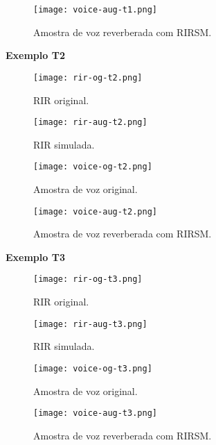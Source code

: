 \begin{figure} [H]
    \centering
    \texttt{[image: voice-aug-t1.png]}
    \caption{Amostra de voz reverberada com RIRSM.}
    \label{fig-a:voice-aug-t1}
\end{figure}

\pagebreak
{\Large \textbf{Exemplo T2}}

\begin{figure} [H]
    \centering
    \texttt{[image: rir-og-t2.png]}
    \caption{RIR original.}
    \label{fig-a:rir-og-t2}
\end{figure} 

\begin{figure} [H]
    \centering
    \texttt{[image: rir-aug-t2.png]}
    \caption{RIR simulada.}
    \label{fig-a:rir-aug-t2}
\end{figure} 

\begin{figure} [H]
    \centering
    \texttt{[image: voice-og-t2.png]}
    \caption{Amostra de voz original.}
    \label{fig-a:voice-og-t2}
\end{figure} 

\begin{figure} [H]
    \centering
    \texttt{[image: voice-aug-t2.png]}
    \caption{Amostra de voz reverberada com RIRSM.}
    \label{fig-a:voice-aug-t2}
\end{figure}

\pagebreak
{\Large \textbf{Exemplo T3}}

\begin{figure} [H]
    \centering
    \texttt{[image: rir-og-t3.png]}
    \caption{RIR original.}
    \label{fig-a:rir-og-t3}
\end{figure} 

\begin{figure} [H]
    \centering
    \texttt{[image: rir-aug-t3.png]}
    \caption{RIR simulada.}
    \label{fig-a:rir-aug-t3}
\end{figure} 

\begin{figure} [H]
    \centering
    \texttt{[image: voice-og-t3.png]}
    \caption{Amostra de voz original.}
    \label{fig-a:voice-og-t3}
\end{figure} 

\begin{figure} [H]
    \centering
    \texttt{[image: voice-aug-t3.png]}
    \caption{Amostra de voz reverberada com RIRSM.}
    \label{fig-a:voice-aug-t3}
\end{figure}

